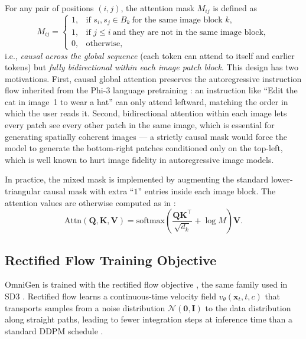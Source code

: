 \documentclass[conference]{IEEEtran}
\begin{document}
For any pair of positions $(i,j)$, the attention mask $M_{ij}$ is defined as
\begin{equation}
M_{ij}=
\begin{cases}
1, & \text{if } s_i,s_j\in B_k\ \text{for the same image block } k,\\
1, & \text{if } j\le i\ \text{and they are not in the same image block},\\
0, & \text{otherwise},
\end{cases}
\end{equation}
i.e., \emph{causal across the global sequence} (each token can attend to itself and earlier tokens) but \emph{fully bidirectional within each image patch block}. This design has two motivations. First, causal global attention preserves the autoregressive instruction flow inherited from the Phi-3 language pretraining \cite{phi3}: an instruction like ``Edit the cat in image~1 to wear a hat'' can only attend leftward, matching the order in which the user reads it. Second, bidirectional attention within each image lets every patch see every other patch in the same image, which is essential for generating spatially coherent images --- a strictly causal mask would force the model to generate the bottom-right patches conditioned only on the top-left, which is well known to hurt image fidelity in autoregressive image models.

In practice, the mixed mask is implemented by augmenting the standard lower-triangular causal mask with extra ``$1$'' entries inside each image block. The attention values are otherwise computed as in \cite{vaswani2017attention}:
\begin{equation}
\mathrm{Attn}(\mathbf{Q},\mathbf{K},\mathbf{V})=\mathrm{softmax}\!\left(\frac{\mathbf{Q}\mathbf{K}^\top}{\sqrt{d_k}}+\log M\right)\mathbf{V}.
\end{equation}

\subsection{Rectified Flow Training Objective}
OmniGen is trained with the rectified flow objective \cite{liu2022flow,lipman2022flow}, the same family used in SD3 \cite{sd3}. Rectified flow learns a continuous-time velocity field $v_\theta(\mathbf{x}_t,t,c)$ that transports samples from a noise distribution $\mathcal{N}(\mathbf{0},\mathbf{I})$ to the data distribution along straight paths, leading to fewer integration steps at inference time than a standard DDPM schedule \cite{ho2020denoising}.
\end{document}
